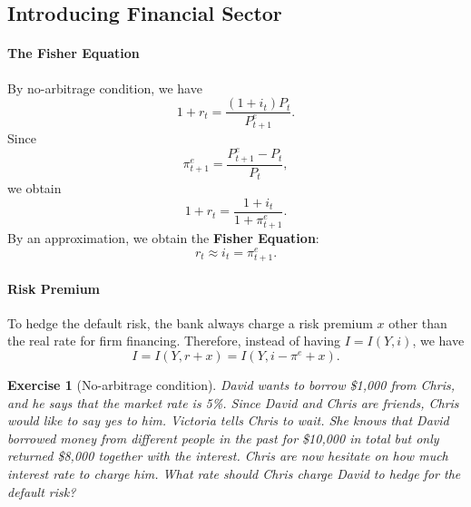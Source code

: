\documentclass[12pt]{article}
\newtheorem{exercise}{Exercise}
\begin{document}
\subsection*{Introducing Financial Sector}
\paragraph{The Fisher Equation}
By no-arbitrage condition, we have
\[ 1 + r_t = \frac{(1 + i_t) P_t}{P^e_{t+1}}.\]
Since
\[\pi^e_{t+1} = \frac{P^e_{t+1}-P_t}{P_t},\]
we obtain
\[1 + r_t = \frac{1 + i_t}{1 + \pi^e_{t+1}}.\]
By an approximation, we obtain the \textbf{Fisher Equation}:
\[r_t \approx i_t = \pi^e_{t+1}.\]

\paragraph{Risk Premium}
To hedge the default risk, the bank always charge a risk premium $x$ other than the real rate for firm financing. Therefore, instead of having $I = I(Y,i)$, we have
\[ I = I (Y, r+x) = I(Y, i-\pi^e+x).\]

\begin{exercise}[No-arbitrage condition]
    David wants to borrow \$1,000 from Chris, and he says that the market rate is 5\%. Since David and Chris are friends, Chris would like to say yes to him. Victoria tells Chris to wait. She knows that David borrowed money from different people in the past for \$10,000 in total but only returned \$8,000 together with the interest. Chris are now hesitate on how much interest rate to charge him. What rate should Chris charge David to hedge for the default risk?
\end{exercise}
\end{document}
